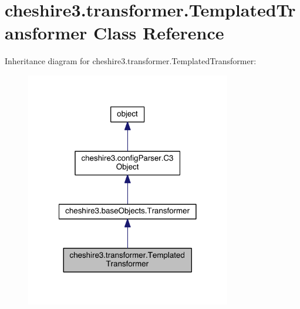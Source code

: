 \hypertarget{classcheshire3_1_1transformer_1_1_templated_transformer}{\section{cheshire3.\-transformer.\-Templated\-Transformer Class Reference}
\label{classcheshire3_1_1transformer_1_1_templated_transformer}
}


Inheritance diagram for cheshire3.\-transformer.\-Templated\-Transformer\-:
\nopagebreak
\begin{figure}[H]
\begin{center}
\leavevmode
\includegraphics[width=254pt]{classcheshire3_1_1transformer_1_1_templated_transformer__inherit__graph}
\end{center}
\end{figure}


